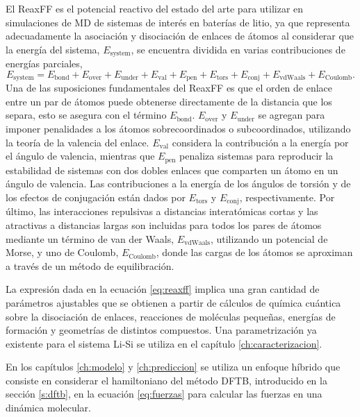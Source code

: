 El ReaxFF \cite{reaxff} es el potencial reactivo del estado del arte para 
utilizar en simulaciones de MD de sistemas de interés en baterías de litio, ya
que representa adecuadamente la asociación y disociación de enlaces de átomos al 
considerar que la energía del sistema, $E_{\text{system}}$, se encuentra dividida
en varias contribuciones de energías parciales,
\begin{equation}\label{eq:reaxff}
    E_{\text{system}} = E_{\text{bond}} + E_{\text{over}} + E_{\text{under}} + E_{\text{val}} + E_{\text{pen}} + E_{\text{tors}} + E_{\text{conj}} + E_{\text{vdWaals}} + E_{\text{Coulomb}}.
\end{equation}
Una de las suposiciones fundamentales del ReaxFF es que el orden de enlace entre
un par de átomos puede obtenerse directamente de la distancia que los separa, 
esto se asegura con el término $E_{\text{bond}}$. $E_{\text{over}}$ y 
$E_{\text{under}}$ se agregan para imponer penalidades a los átomos 
sobrecoordinados o subcoordinados, utilizando la teoría de la valencia del enlace.
$E_{\text{val}}$ considera la contribución a la energía por el ángulo de valencia, 
mientras que $E_{\text{pen}}$ penaliza sistemas para reproducir la estabilidad de 
sistemas con dos dobles enlaces que comparten un átomo en un ángulo de valencia.
Las contribuciones a la energía de los ángulos de torsión y de los efectos de 
conjugación están dados por $E_{\text{tors}}$ y $E_{\text{conj}}$, 
respectivamente. Por último, las interacciones repulsivas a distancias 
interatómicas cortas y las atractivas a distancias largas son incluidas para 
todos los pares de átomos mediante un término de van der Waals, 
$E_{\text{vdWaals}}$, utilizando un potencial de Morse, y uno de Coulomb, 
$E_{\text{Coulomb}}$, donde las cargas de los átomos se aproximan a través de 
un método de equilibración.

La expresión dada en la ecuación \ref{eq:reaxff} implica una gran cantidad de 
parámetros ajustables que se obtienen a partir de cálculos de química cuántica
sobre la disociación de enlaces, reacciones de moléculas pequeñas, energías de 
formación y geometrías de distintos compuestos. Una parametrización ya existente
para el sistema Li-Si \cite{fan2013} se utiliza en el capítulo 
\ref{ch:caracterizacion}.

En los capítulos \ref{ch:modelo} y \ref{ch:prediccion} se utiliza un enfoque 
híbrido que consiste en considerar el hamiltoniano del método DFTB, introducido 
en la sección \ref{s:dftb}, en la ecuación \ref{eq:fuerzas} para calcular las 
fuerzas en una dinámica molecular.

